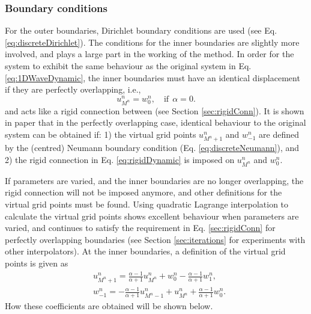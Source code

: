 \subsubsection{Boundary conditions}
For the outer boundaries, Dirichlet boundary conditions are used (see Eq. \eqref{eq:discreteDirichlet}).
The conditions for the inner boundaries are slightly more involved, and plays a large part in the working of the method. 
In order for the system to exhibit the same behaviour as the original system in Eq. \eqref{eq:1DWaveDynamic}, the inner boundaries must have an identical displacement if they are perfectly overlapping, i.e.,
\begin{equation}\label{eq:rigidDynamic}
    u_{M^n}^n = w_0^n, \quad \text{if}\ \ \alpha = 0.
\end{equation}
and acts like a rigid connection between (see Section \ref{sec:rigidConn}). It is shown in paper \citeP[G] that in the perfectly overlapping case, identical behaviour to the original system can be obtained if: 1) the virtual grid points $u_{M^n+1}^n$ and $w_{-1}^n$ are defined by the (centred) Neumann boundary condition (Eq. \eqref{eq:discreteNeumann}), and 2) the rigid connection in Eq. \eqref{eq:rigidDynamic} is imposed on $u_{M^n}^n$ and $w_0^n$. 

If parameters are varied, and the inner boundaries are no longer overlapping, the rigid connection will not be imposed anymore, and other definitions for the virtual grid points must be found. Using quadratic Lagrange interpolation to calculate the virtual grid points shows excellent behaviour when parameters are varied, and continues to satisfy the requirement in Eq. \eqref{sec:rigidConn} for perfectly overlapping boundaries (see Section \ref{sec:iterations} for experiments with other interpolators). At the inner boundaries, a definition of the virtual grid points is given as
\begin{subequations}\label{eq:connectionInterpol}
    \begin{align}
            &u_{M^n+1}^n = \frac{\alpha - 1}{\alpha + 1}u_{M^n}^n + w_0^n - \frac{\alpha - 1}{\alpha + 1}w_1^n,
        \label{eq:calcUMP1}\\
            &w_{-1}^n = -\frac{\alpha - 1}{\alpha + 1}u_{M^n-1}^n + u_{M^n}^n+ \frac{\alpha - 1}{\alpha + 1}w_{0}^n.\label{eq:calcWM1}
    \end{align}
\end{subequations}
How these coefficients are obtained will be shown below. 

